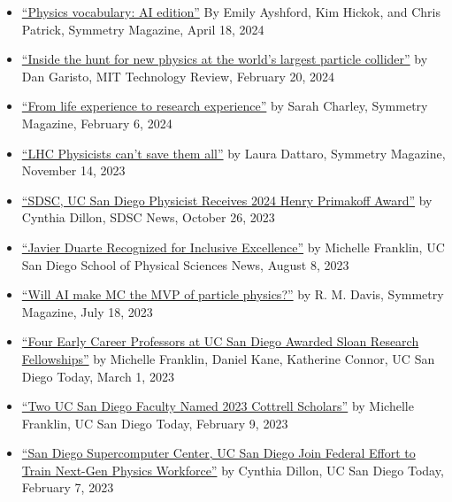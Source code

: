 \documentclass[11pt]{res}
\begin{document}
\begin{resume}
  \begin{itemize}
    \itemsep-0.3em
    \item \href{https://www.symmetrymagazine.org/article/physics-vocabulary-ai-edition}{``Physics vocabulary: AI edition''} By Emily Ayshford, Kim Hickok, and Chris Patrick, Symmetry Magazine, April 18, 2024
    \item \href{https://www.technologyreview.com/2024/02/20/1088002/higgs-boson-physics-particle-collider-large-hadron-collider/}{``Inside the hunt for new physics at the world's largest particle collider''} by Dan Garisto, MIT Technology Review, February 20, 2024
    \item \href{https://www.symmetrymagazine.org/article/from-life-experience-to-research-experience}{``From life experience to research experience''} by Sarah Charley, Symmetry Magazine, February 6, 2024
    \item \href{https://www.symmetrymagazine.org/article/lhc-physicists-cant-save-them-all}{``LHC Physicists can't save them all''} by Laura Dattaro, Symmetry Magazine, November 14, 2023
    \item \href{https://www.sdsc.edu/News%20Items/PR20231026_physics_award.html}{``SDSC, UC San Diego Physicist Receives 2024 Henry Primakoff Award''} by Cynthia Dillon, SDSC News, October 26, 2023
    \item \href{https://physicalsciences.ucsd.edu/media-events/articles/2023/duarte-edi.html}{``Javier Duarte Recognized for Inclusive Excellence''} by Michelle Franklin, UC San Diego School of Physical Sciences News, August 8, 2023
    \item \href{https://www.symmetrymagazine.org/article/will-ai-make-mc-the-mvp-of-particle-physics}{``Will AI make MC the MVP of particle physics?''} by R. M. Davis, Symmetry Magazine, July 18, 2023
    \item \href{https://today.ucsd.edu/story/four-early-career-professors-at-uc-san-diego-awarded-sloan-research-fellowships}{``Four Early Career Professors at UC San Diego Awarded Sloan Research Fellowships''} by Michelle Franklin, Daniel Kane, Katherine Connor, UC San Diego Today, March 1, 2023
    \item \href{https://today.ucsd.edu/story/2023-cottrell-scholars}{``Two UC San Diego Faculty Named 2023 Cottrell Scholars''} by Michelle Franklin, UC San Diego Today, February 9, 2023
    \item \href{https://today.ucsd.edu/story/san-diego-supercomputer-center-uc-san-diego-join-federal-effort-to-train-next-gen-physics-workforce}{``San Diego Supercomputer Center, UC San Diego Join Federal Effort to Train Next-Gen Physics Workforce''} by Cynthia Dillon, UC San Diego Today, February 7, 2023

\end{itemize}
\end{resume}
\end{document}
